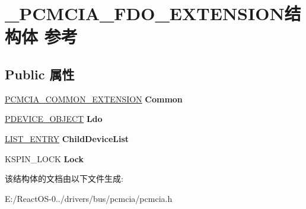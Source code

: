\hypertarget{struct___p_c_m_c_i_a___f_d_o___e_x_t_e_n_s_i_o_n}{}\section{\+\_\+\+P\+C\+M\+C\+I\+A\+\_\+\+F\+D\+O\+\_\+\+E\+X\+T\+E\+N\+S\+I\+O\+N结构体 参考}
\label{struct___p_c_m_c_i_a___f_d_o___e_x_t_e_n_s_i_o_n}
\subsection*{Public 属性}
\begin{DoxyCompactItemize}
\item 
\mbox{\label{struct___p_c_m_c_i_a___f_d_o___e_x_t_e_n_s_i_o_n_a5ac17e0fbb2b415af72b502c5fb6be55}} 
\hyperlink{struct___p_c_m_c_i_a___c_o_m_m_o_n___e_x_t_e_n_s_i_o_n}{P\+C\+M\+C\+I\+A\+\_\+\+C\+O\+M\+M\+O\+N\+\_\+\+E\+X\+T\+E\+N\+S\+I\+ON} {\bfseries Common}
\item 
\mbox{\label{struct___p_c_m_c_i_a___f_d_o___e_x_t_e_n_s_i_o_n_a5ef90b63196eb7f02c8427d1b75c1259}} 
\hyperlink{struct___d_e_v_i_c_e___o_b_j_e_c_t}{P\+D\+E\+V\+I\+C\+E\+\_\+\+O\+B\+J\+E\+CT} {\bfseries Ldo}
\item 
\mbox{\label{struct___p_c_m_c_i_a___f_d_o___e_x_t_e_n_s_i_o_n_ad84968a0a6c5fde8eebd149b0a53c6e3}} 
\hyperlink{struct___l_i_s_t___e_n_t_r_y}{L\+I\+S\+T\+\_\+\+E\+N\+T\+RY} {\bfseries Child\+Device\+List}
\item 
\mbox{\label{struct___p_c_m_c_i_a___f_d_o___e_x_t_e_n_s_i_o_n_a59e596de366d475dee69f092335bda44}} 
K\+S\+P\+I\+N\+\_\+\+L\+O\+CK {\bfseries Lock}
\end{DoxyCompactItemize}


该结构体的文档由以下文件生成\+:\begin{DoxyCompactItemize}
\item 
E\+:/\+React\+O\+S-\/0../drivers/bus/pcmcia/pcmcia.\+h\end{DoxyCompactItemize}
